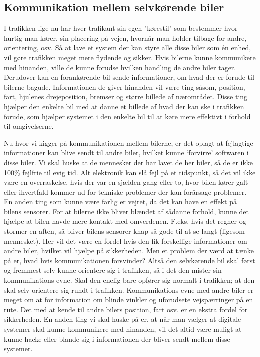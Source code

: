 
\subsection{Kommunikation mellem selvkørende biler}

I trafikken lige nu har hver trafikant sin egen "kørestil" som bestemmer hvor hurtig man kører, sin placering på vejen, hvornår man holder tilbage for andre, orientering, osv.  Så at lave et system der kan styre alle disse biler som \'en enhed, vil gøre trafikken meget mere flydende og sikker. Hvis bilerne kunne kommunikere med hinanden, ville de kunne forudse hvilken handling de andre biler tager. Derudover kan en forankørende bil sende informationer, om hvad der er forude til bilerne bagude. Informationen de giver hinanden vil være ting såsom, position, fart, hjulenes drejeposition, bremser og større billede af nærområdet. Disse ting hjælper den enkelte bil med at danne et billede af hvad der kan ske i trafikken forude, som hjælper systemet i den enkelte bil til at køre mere effektivt i forhold til omgivelserne. 

Nu hvor vi kigger på kommunikationen mellem bilerne, er det oplagt at fejlagtige informationer kan blive sendt til andre biler, hvilket kunne `forvirre' softwaren i disse biler. Vi skal huske at de mennesker der har lavet de her biler, så de er ikke 100\% fejlfrie til evig tid. Alt elektronik kan slå fejl på et tidspunkt, så det vil ikke være en overraskelse, hvis der var en sjælden gang eller to, hvor bilen kører galt eller ihvertfald kommer ud for tekniske problemer der kan forårsage problemer. En anden ting som kunne være farlig er vejret, da det kan have en effekt på bilens sensorer. For at bilerne ikke bliver blændet af sådanne forhold, kunne det hjælpe at bilen havde mere kontakt med omverdenen. F.eks. hvis det regner og stormer en aften, så bliver bilens sensorer knap så gode til at se langt (ligesom mennesket). Her vil det være en fordel hvis den fik forskellige informationer om andre biler, hvilket vil hjælpe på sikkerheden. Men et problem der værd at tænke på er, hvad hvis kommunikationen forsvinder? Altså den selvkørende bil skal først og fremmest selv kunne orientere sig i trafikken, så i det den mister sin kommunikations evne. Skal den enelig bare opfører sig normalt i trafikken; at den skal selv orientere sig rundt i trafikken. Kommunikations evne med andre biler er meget om at for information om blinde vinkler og uforudsete vejspærringer på en rute. Det med at kende til andre bilers position, fart osv. er en ekstra fordel for sikkerheden. En anden ting vi skal huske på er, at når man vælger at digitale systemer skal kunne kommunikere med hinanden, vil det altid være muligt at kunne hacke eller blande sig i informationen der bliver sendt mellem disse systemer.
